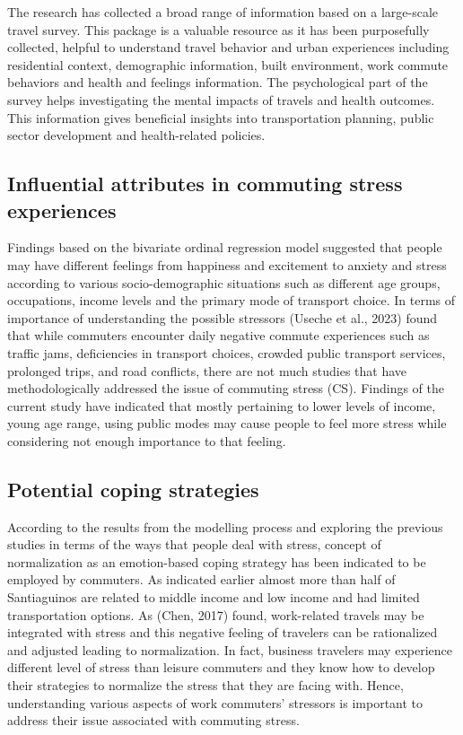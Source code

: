 \documentclass[
11pt, %
oneside, %
english, %
singlespacing, %
]{macthesis} %
\begin{document}
The research has collected a broad range of information based on a large-scale travel survey. This package is a valuable resource as it has been purposefully collected, helpful to understand travel behavior and urban experiences including residential context, demographic information, built environment, work commute behaviors and health and feelings information. The psychological part of the survey helps investigating the mental impacts of travels and health outcomes. This information gives beneficial insights into transportation planning, public sector development and health-related policies.

\hypertarget{influential-attributes-in-commuting-stress-experiences}{%
\subsection{Influential attributes in commuting stress experiences}\label{influential-attributes-in-commuting-stress-experiences}}

Findings based on the bivariate ordinal regression model suggested that people may have different feelings from happiness and excitement to anxiety and stress according to various socio-demographic situations such as different age groups, occupations, income levels and the primary mode of transport choice. In terms of importance of understanding the possible stressors (Useche et al., 2023) found that while commuters encounter daily negative commute experiences such as traffic jams, deficiencies in transport choices, crowded public transport services, prolonged trips, and road conflicts, there are not much studies that have methodologically addressed the issue of commuting stress (CS). Findings of the current study have indicated that mostly pertaining to lower levels of income, young age range, using public modes may cause people to feel more stress while considering not enough importance to that feeling.

\hypertarget{potential-coping-strategies}{%
\subsection{Potential coping strategies}\label{potential-coping-strategies}}

According to the results from the modelling process and exploring the previous studies in terms of the ways that people deal with stress, concept of normalization as an emotion-based coping strategy has been indicated to be employed by commuters. As indicated earlier almost more than half of Santiaguinos are related to middle income and low income and had limited transportation options. As (Chen, 2017) found, work-related travels may be integrated with stress and this negative feeling of travelers can be rationalized and adjusted leading to normalization. In fact, business travelers may experience different level of stress than leisure commuters and they know how to develop their strategies to normalize the stress that they are facing with. Hence, understanding various aspects of work commuters' stressors is important to address their issue associated with commuting stress.
\end{document}

